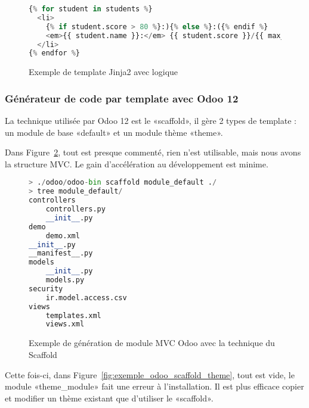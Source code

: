 
\begin{figure}
\begin{lstlisting}[language=Python]
{% for student in students %}
  <li>
	{% if student.score > 80 %}:){% else %}:({% endif %}
	<em>{{ student.name }}:</em> {{ student.score }}/{{ max_score }}
  </li>
{% endfor %}
\end{lstlisting}
\caption{Exemple de template Jinja2 avec logique}
\label{fig:gen_code_template_template_2}
\end{figure}


\subsubsection{Générateur de code par template avec Odoo 12}

La technique utilisée par Odoo 12 est le «scaffold», il gère 2 types de template : un module de base «default» et un module thème «theme».

Dans Figure~\ref{fig:exemple_odoo_scaffold_module}, tout est presque commenté, rien n’est utilisable, mais nous avons la structure MVC. Le gain d’accélération au développement est minime.

\begin{figure}
\begin{lstlisting}[language=Python]
> ./odoo/odoo-bin scaffold module_default ./
> tree module_default/
controllers
    controllers.py
    __init__.py
demo
    demo.xml
__init__.py
__manifest__.py
models
    __init__.py
    models.py
security
    ir.model.access.csv
views
    templates.xml
	views.xml
\end{lstlisting}
\caption{Exemple de génération de module MVC Odoo avec la technique du Scaffold}
\label{fig:exemple_odoo_scaffold_module}
\end{figure}

Cette fois-ci, dans Figure~\ref{fig:exemple_odoo_scaffold_theme}, tout est vide, le module «theme\_module» fait une erreur à l'installation. Il est plus efficace copier et modifier un thème existant que d'utiliser le «scaffold».


